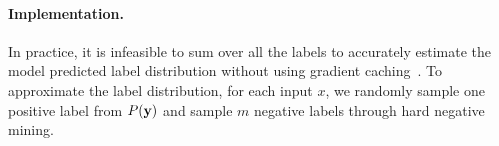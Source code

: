 \paragraph{Implementation.}
In practice, it is infeasible to sum over all the labels to accurately estimate the model predicted label distribution without using gradient caching~\citep{guo2020accelerating}.
To approximate the label distribution, for each input $x$, we randomly sample one positive label from $P({\mathbf{y}})$ and sample $m$ negative labels through hard negative mining.






